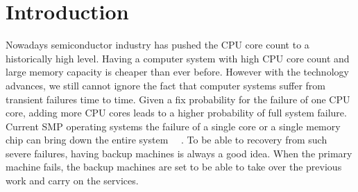 \chapter{Introduction}





Nowadays semiconductor industry has pushed the CPU core count to a historically high level. Having a computer system with high CPU core count and large memory capacity is cheaper than ever before. However with the technology advances, we still cannot ignore the fact that computer systems suffer from transient failures time to time. Given a fix probability for the failure of one CPU core, adding more CPU cores leads to a higher probability of full system failure. Current SMP operating systems the failure of a single core or a single memory chip can bring down the entire system ~\cite{sridharan2015memory}~\cite{meza2015revisiting}. To be able to recovery from such severe failures, having backup machines is always a good idea. When the primary machine fails, the backup machines are set to be able to take over the previous work and carry on the services.

